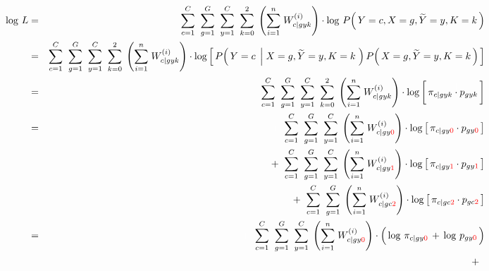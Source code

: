 \vskip 0.3cm
\begin{eqnarray*}
\log\,L &=&
	\overset{C}{\underset{c=1}{\sum}}\;\;
	\overset{G}{\underset{g=1}{\sum}}\;\;
	\overset{C}{\underset{y=1}{\sum}}\;\;
	\overset{2}{\underset{k=0}{\sum}}\;
	\left(\overset{n}{\underset{i=1}{\sum}}\;W^{(i)}_{c \vert gyk}\right)
	\cdot
	\log\,P\!\left(\,Y=c,X=g,\widetilde{Y}=y,K=k\,\right)
\\
&=&
	\overset{C}{\underset{c=1}{\sum}}\;\;
	\overset{G}{\underset{g=1}{\sum}}\;\;
	\overset{C}{\underset{y=1}{\sum}}\;\;
	\overset{2}{\underset{k=0}{\sum}}\;
	\left(\overset{n}{\underset{i=1}{\sum}}\;W^{(i)}_{c \vert gyk}\right)
	\cdot
	\log\left[\,
		P\!\left(\,Y=c\;\left\vert\;X=g,\widetilde{Y}=y,K=k\right.\,\right)
		P\!\left(\,X=g,\widetilde{Y}=y,K=k\,\right)
	\,\right]
\\
&=&
	\overset{C}{\underset{c=1}{\sum}}\;\;
	\overset{G}{\underset{g=1}{\sum}}\;\;
	\overset{C}{\underset{y=1}{\sum}}\;\;
	\overset{2}{\underset{k=0}{\sum}}\;
	\left(\overset{n}{\underset{i=1}{\sum}}\;W^{(i)}_{c \vert gyk}\right)
	\cdot
	\log\left[\,
		\pi_{c \vert gyk} \overset{{\color{white}\vert}}{\cdot} p_{gyk}
	\,\right]
\\
&=&
	{\color{white}+} \;\;
	\overset{C}{\underset{c=1}{\sum}}\;\;
	\overset{G}{\underset{g=1}{\sum}}\;\;
	\overset{C}{\underset{y=1}{\sum}}\;
	\left(\overset{n}{\underset{i=1}{\sum}}\;W^{(i)}_{c \vert gy{\color{red}0}}\right)
	\cdot
	\log\left[\,
		\pi_{c \vert gy\color{red}0} \cdot p_{gy\color{red}0}
	\,\right]
\\
&&
	+ \;\;
	\overset{C}{\underset{c=1}{\sum}}\;\;
	\overset{G}{\underset{g=1}{\sum}}\;\;
	\overset{C}{\underset{y=1}{\sum}}\;
	\left(\overset{n}{\underset{i=1}{\sum}}\;W^{(i)}_{c \vert gy{\color{red}1}}\right)
	\cdot
	\log\left[\,
		\pi_{c \vert gy\color{red}1} \cdot p_{gy\color{red}1}
	\,\right]
\\
&&
	+ \;\;
	\overset{C}{\underset{c=1}{\sum}}\;\;
	\overset{G}{\underset{g=1}{\sum}}\;
	\left(\overset{n}{\underset{i=1}{\sum}}\;W^{(i)}_{c \vert gc{\color{red}2}}\right)
	\cdot
	\log\left[\,
		\pi_{c \vert gc\color{red}2} \cdot p_{gc\color{red}2}
	\,\right]
\\
&=&
	{\color{white}+} \;\;
	\overset{C}{\underset{c=1}{\sum}}\;\;
	\overset{G}{\underset{g=1}{\sum}}\;\;
	\overset{C}{\underset{y=1}{\sum}}\;
	\left(\overset{n}{\underset{i=1}{\sum}}\;W^{(i)}_{c \vert gy{\color{red}0}}\right)
	\cdot
	\left(\,
		\log\,\pi_{c \vert gy\color{red}0} \,\overset{{\color{white}.}}{+}\, \log\,p_{gy\color{red}0}
	\,\right)
\\
&&
	+ \;\;

\end{eqnarray*}
